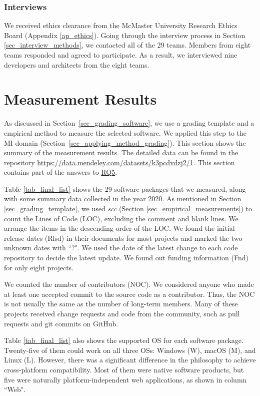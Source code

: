 \documentclass[preprint,12pt,authoryear]{elsarticle}
\begin{document}
\subsubsection{Interviews}
\label{sec_apply_to_mi_interviews}
We received ethics clearance from the McMaster University Research Ethics Board
(Appendix \ref{ap_ethics}). Going through the interview process in Section
\ref{sec_interview_methods}, we contacted all of the 29 teams. Members from
eight teams responded and agreed to participate. As a result, we interviewed
nine developers and architects from the eight teams.

\section{Measurement Results} \label{ch_results}

As discussed in Section~\ref{sec_grading_software}, we use a grading template
and a empirical method to measure the selected software. We applied this step to
the MI domain (Section~\ref{sec_applying_method_grading}). This section shows
the summary of the measurement results. The detailed data can be found in the
repository
\hyperlink{https://data.mendeley.com/datasets/k3pcdvdzj2/1}{https://data.mendeley.com/datasets/k3pcdvdzj2/1}.
This section contains part of the answers to \hyperlink{rq5}{RQ5}.

Table \ref{tab_final_list} shows the 29 software packages that we measured,
along with some summary data collected in the year 2020. As mentioned in Section
\ref{sec_grading_template}, we used \textit{scc} (Section
\ref{sec_empirical_measurements}) to count the Lines of Code (LOC), excluding
the comment and blank lines. We arrange the items in the descending order of the
LOC. We found the initial release dates (Rlsd) in their documents for most
projects and marked the two unknown dates with ``?". We used the date of the
latest change to each code repository to decide the latest update. We found out
funding information (Fnd) for only eight projects.

We counted the number of contributors (NOC). We considered anyone who made at
least one accepted commit to the source code as a contributor. Thus, the NOC is
not usually the same as the number of long-term members. Many of these projects
received change requests and code from the community, such as pull requests and
git commits on GitHub.

Table \ref{tab_final_list} also shows the supported OS for each software
package. Twenty-five of them could work on all three OSs: Windows (W), macOS
(M), and Linux (L). However, there was a significant difference in the
philosophy to achieve cross-platform compatibility. Most of them were native
software products, but five were naturally platform-independent web
applications, as shown in column ``Web".
\end{document}
